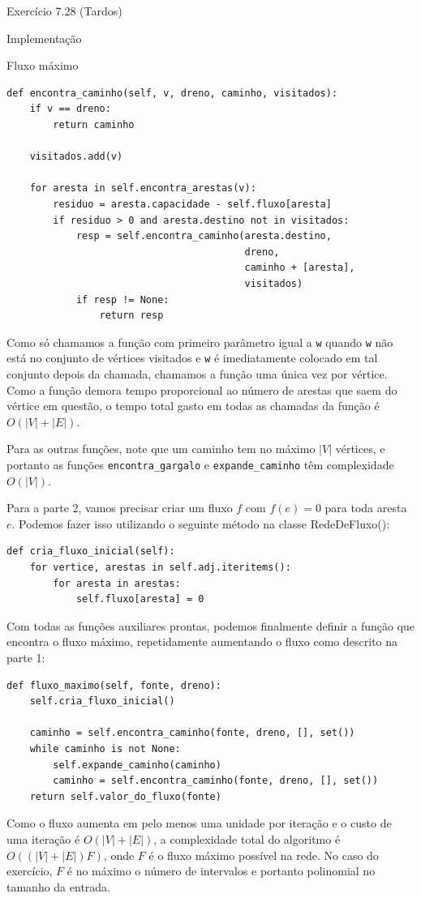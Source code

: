 \documentclass[presentation]{beamer}
\begin{document}
\begin{frame}[fragile,label=sec-2]{Exercício 7.28 (Tardos)}
\begin{block}{Implementação}
\begin{block}{Fluxo máximo}
\begin{verbatim}
def encontra_caminho(self, v, dreno, caminho, visitados):
    if v == dreno:
        return caminho

    visitados.add(v)

    for aresta in self.encontra_arestas(v):
        residuo = aresta.capacidade - self.fluxo[aresta]
        if residuo > 0 and aresta.destino not in visitados:
            resp = self.encontra_caminho(aresta.destino,
                                         dreno,
                                         caminho + [aresta],
                                         visitados)
            if resp != None:
                return resp
\end{verbatim}

Como só chamamos a função com primeiro parâmetro igual a \verb~w~ quando
\verb~w~ não está no conjunto de vértices visitados e \verb~w~ é imediatamente
colocado em tal conjunto depois da chamada, chamamos a função uma
única vez por vértice. Como a função demora tempo proporcional ao
número de arestas que saem do vértice em questão, o tempo total gasto
em todas as chamadas da função é $O(|V| + |E|)$.

Para as outras funções, note que um caminho tem no máximo $|V|$
vértices, e portanto as funções \verb~encontra_gargalo~ e \verb~expande_caminho~
têm complexidade $O(|V|)$.

Para a parte 2, vamos precisar criar um fluxo $f$ com $f(e) = 0$ para
toda aresta $e$. Podemos fazer isso utilizando o seguinte método na
classe RedeDeFluxo():
\begin{verbatim}
def cria_fluxo_inicial(self):
    for vertice, arestas in self.adj.iteritems():
        for aresta in arestas:
            self.fluxo[aresta] = 0
\end{verbatim}

Com todas as funções auxiliares prontas, podemos finalmente definir a
função que encontra o fluxo máximo, repetidamente aumentando o fluxo
como descrito na parte 1:
\begin{verbatim}
def fluxo_maximo(self, fonte, dreno):
    self.cria_fluxo_inicial()

    caminho = self.encontra_caminho(fonte, dreno, [], set())
    while caminho is not None:
        self.expande_caminho(caminho)
        caminho = self.encontra_caminho(fonte, dreno, [], set())
    return self.valor_do_fluxo(fonte)
\end{verbatim}

Como o fluxo aumenta em pelo menos uma unidade por iteração e o custo
de uma iteração é $O(|V| + |E|)$, a complexidade total do algoritmo é
$O((|V|+|E|)F)$, onde $F$ é o fluxo máximo possível na rede. No caso
do exercício, $F$ é no máximo o número de intervalos e portanto
polinomial no tamanho da entrada.
\end{block}


\end{block}
\end{frame}
\end{document}
